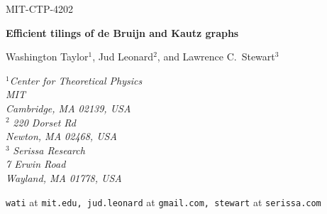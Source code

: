 \documentclass[12pt]{article}
\begin{document}
\pagestyle{plain}
\setcounter{page}{1}

\baselineskip16pt

\begin{titlepage}

\begin{flushright}
MIT-CTP-4202
\end{flushright}
\vspace{8 mm}

\begin{center}

{\Large \bf Efficient tilings of de Bruijn and Kautz graphs\\}
\vspace{3mm}

\end{center}

\vspace{7 mm}


\begin{center}

Washington Taylor$^{1}$, Jud Leonard$^2$, 
and Lawrence C.\ Stewart$^3$

\vspace{3mm}
${}^1${\small \sl Center for Theoretical Physics\\
MIT\\
Cambridge, MA 02139, USA} \\[0.15in]
$^2${\small \sl
220 Dorset Rd\\
Newton, MA 02468, USA}\\[0.15in]
$^3${\small \sl 
Serissa Research\\
7 Erwin Road\\
Wayland, MA 01778, USA}\\

\vspace{3mm}

{\small \tt wati} at {\tt mit.edu, jud.leonard} at {\tt gmail.com, stewart} at {\tt serissa.com} \\

\end{center}

\vspace{8 mm}


\end{titlepage}
\end{document}
